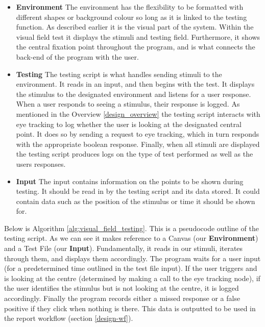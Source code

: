 \documentclass{l4proj}
\begin{document}
\begin{itemize}
    \item \textbf{Environment}
The environment has the flexibility to be formatted with different shapes or background colour so long as it is linked to the testing function. As described earlier it is the visual part of the system. Within the visual field test it displays the stimuli and testing field. Furthermore, it shows the central fixation point throughout the program, and is what connects the back-end of the program with the user.
    \item \textbf{Testing}
The testing script is what handles sending stimuli to the environment. It reads in an input, and then begins with the test. 
It displays the stimulus to the designated environment and listens for a user response. When a user responds to seeing a stimulus, their response is logged. As mentioned in the Overview {\ref{design_overview}} the testing script interacts with eye tracking to log whether the user is looking at the designated central point. It does so by sending a request to eye tracking, which in turn responds with the appropriate boolean response. Finally, when all stimuli are displayed the testing script produces logs on the type of test performed as well as the users responses. 
    \item \textbf{Input}
The input contains information on the points to be shown during testing. It should be read in by the testing script and its data stored. It could contain data such as the position of the stimulus or time it should be shown for.
\end{itemize}
Below is Algorithm \ref{alg:visual_field_testing}. This is a pseudocode outline of the testing script. As we can see it makes reference to a Canvas (our \textbf{Environment}) and a Test File (our \textbf{Input}). Fundamentally, it reads in our stimuli, iterates through them, and displays them accordingly. The program waits for a user input (for a predetermined time outlined in the test file input). If the user triggers and is looking at the centre (determined by making a call to the eye tracking node), if the user identifies the stimulus but is not looking at the centre, it is logged accordingly. Finally the program records either a missed response or a false positive if they click when nothing is there. This data is outputted to be used in the report workflow (section \ref{design-wf}).
\newline
\end{document}
